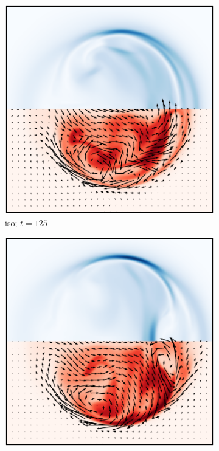 \begin{figure}[t]
  \centering
  \begin{subfigure}[t]{0.32\textwidth}
    \centering
    \includegraphics[width=\linewidth]{slices/final_isotropic_current_density_0025.pdf}
    \caption{iso; $t=125$}
    \label{fig:final_isotropic_current_density_0025}
  \end{subfigure}
  \hfill
  \begin{subfigure}[t]{0.32\textwidth}
    \centering
    \includegraphics[width=\linewidth]{slices/final_isotropic_current_density_0030.pdf}

\end{subfigure}
\end{figure}
